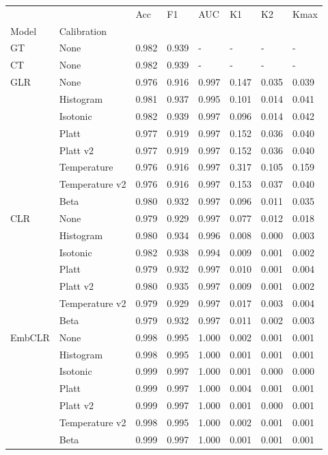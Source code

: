 \begin{tabular}{llllllll}
\toprule
 &  & Acc & F1 & AUC & K1 & K2 & Kmax \\
Model & Calibration &  &  &  &  &  &  \\
\midrule
GT & None & 0.982 & 0.939 & - & - & - & - \\
\cline{1-8}
CT & None & 0.982 & 0.939 & - & - & - & - \\
\cline{1-8}
\multirow[t]{8}{*}{GLR} & None & 0.976 & 0.916 & 0.997 & 0.147 & 0.035 & 0.039 \\
 & Histogram & 0.981 & 0.937 & 0.995 & 0.101 & 0.014 & 0.041 \\
 & Isotonic & 0.982 & 0.939 & 0.997 & 0.096 & 0.014 & 0.042 \\
 & Platt & 0.977 & 0.919 & 0.997 & 0.152 & 0.036 & 0.040 \\
 & Platt v2 & 0.977 & 0.919 & 0.997 & 0.152 & 0.036 & 0.040 \\
 & Temperature & 0.976 & 0.916 & 0.997 & 0.317 & 0.105 & 0.159 \\
 & Temperature v2 & 0.976 & 0.916 & 0.997 & 0.153 & 0.037 & 0.040 \\
 & Beta & 0.980 & 0.932 & 0.997 & 0.096 & 0.011 & 0.035 \\
\cline{1-8}
\multirow[t]{7}{*}{CLR} & None & 0.979 & 0.929 & 0.997 & 0.077 & 0.012 & 0.018 \\
 & Histogram & 0.980 & 0.934 & 0.996 & 0.008 & 0.000 & 0.003 \\
 & Isotonic & 0.982 & 0.938 & 0.994 & 0.009 & 0.001 & 0.002 \\
 & Platt & 0.979 & 0.932 & 0.997 & 0.010 & 0.001 & 0.004 \\
 & Platt v2 & 0.980 & 0.935 & 0.997 & 0.009 & 0.001 & 0.002 \\
 & Temperature v2 & 0.979 & 0.929 & 0.997 & 0.017 & 0.003 & 0.004 \\
 & Beta & 0.979 & 0.932 & 0.997 & 0.011 & 0.002 & 0.003 \\
\cline{1-8}
\multirow[t]{7}{*}{EmbCLR} & None & 0.998 & 0.995 & 1.000 & 0.002 & 0.001 & 0.001 \\
 & Histogram & 0.998 & 0.995 & 1.000 & 0.001 & 0.001 & 0.001 \\
 & Isotonic & 0.999 & 0.997 & 1.000 & 0.001 & 0.000 & 0.000 \\
 & Platt & 0.999 & 0.997 & 1.000 & 0.004 & 0.001 & 0.001 \\
 & Platt v2 & 0.999 & 0.997 & 1.000 & 0.001 & 0.000 & 0.001 \\
 & Temperature v2 & 0.998 & 0.995 & 1.000 & 0.002 & 0.001 & 0.001 \\
 & Beta & 0.999 & 0.997 & 1.000 & 0.001 & 0.001 & 0.001 \\
\cline{1-8}
\bottomrule
\end{tabular}

